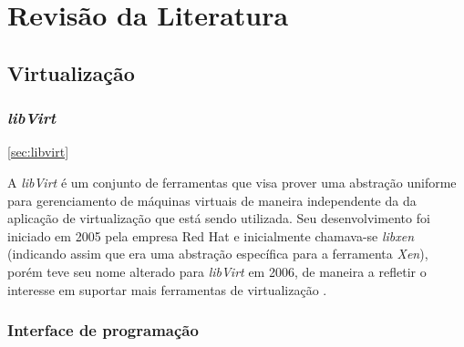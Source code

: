 %
%

\chapter{Revisão da Literatura}



\section{Virtualização}

% 

\subsection{\emph{libVirt}}\ref{sec:libvirt}


A \emph{libVirt} é um conjunto de ferramentas que visa prover uma abstração
uniforme para gerenciamento de máquinas virtuais de maneira independente da
da aplicação de virtualização que está sendo utilizada. Seu desenvolvimento
foi iniciado em 2005 pela empresa Red Hat e inicialmente chamava-se
\emph{libxen} (indicando assim que era uma abstração específica para a
ferramenta \emph{Xen}), porém teve seu nome alterado para \emph{libVirt} em
2006, de maneira a refletir o interesse em suportar mais ferramentas de
virtualização .

\subsection{Interface de programação}


